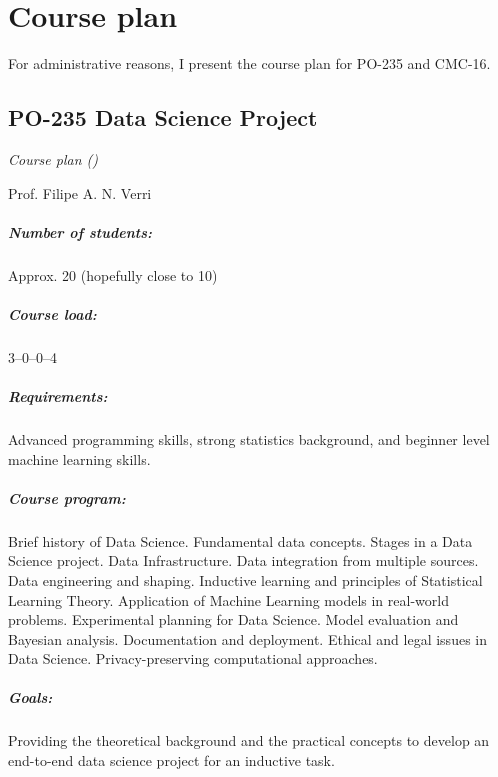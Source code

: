 \chapter*{Course plan}

For administrative reasons, I present the course plan for PO-235 and CMC-16.

\newpage
{}
\thispagestyle{empty}
\section*{PO-235 Data Science Project}

\emph{Course plan (\the\year{})}

Prof. Filipe A. N. Verri

\paragraph{Number of students:} Approx. 20 (hopefully close to 10)

\paragraph{Course load:} 3--0--0--4

\paragraph{Requirements:} Advanced programming skills, strong statistics background, and
beginner level machine learning skills.

\paragraph{Course program:}
Brief history of Data Science.  Fundamental data concepts. Stages in a Data Science
project.  Data Infrastructure. Data integration from multiple sources. Data engineering
and shaping.  Inductive learning and principles of Statistical Learning Theory.
Application of Machine Learning models in real-world problems.  Experimental planning for
Data Science. Model evaluation and Bayesian analysis.  Documentation and deployment.
Ethical and legal issues in Data Science.  Privacy-preserving computational approaches.

\paragraph{Goals:}
Providing the theoretical background and the practical concepts to develop an end-to-end
data science project for an inductive task.


